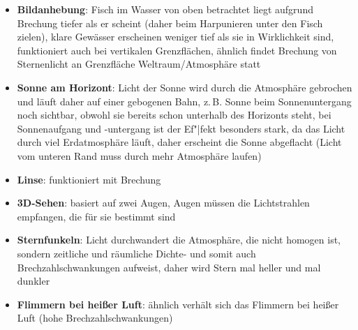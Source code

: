 \linie
\begin{itemize}
    \item
    \textbf{Bildanhebung}:
    Fisch im Wasser von oben betrachtet liegt aufgrund Brechung
    tiefer als er scheint (daher beim Harpunieren unter den Fisch zielen),
    klare Gewässer erscheinen weniger tief als sie in Wirklichkeit sind,
    funktioniert auch bei vertikalen Grenzflächen,
    ähnlich findet Brechung von Sternenlicht an Grenzfläche
    Weltraum/Atmosphäre statt

    \item
    \textbf{Sonne am Horizont}:
    Licht der Sonne wird durch die Atmosphäre gebrochen und läuft daher
    auf einer gebogenen Bahn, z.\,B. Sonne beim Sonnenuntergang
    noch sichtbar, obwohl sie bereits schon unterhalb des Horizonts steht,
    bei Sonnenaufgang und -untergang ist der Ef"|fekt besonders stark,
    da das Licht durch viel Erdatmosphäre läuft,
    daher erscheint die Sonne abgeflacht
    (Licht vom unteren Rand muss durch mehr Atmosphäre laufen)
\end{itemize}
\linie
\begin{itemize}
    \item
    \textbf{Linse}:
    funktioniert mit Brechung

    \item
    \textbf{3D-Sehen}:
    basiert auf zwei Augen,
    Augen müssen die Lichtstrahlen empfangen, die für sie bestimmt sind
\end{itemize}
\linie
\begin{itemize}
    \item
    \textbf{Sternfunkeln}:
    Licht durchwandert die Atmosphäre, die nicht homogen ist,
    sondern zeitliche und räumliche Dichte- und somit auch
    Brechzahlschwankungen aufweist, daher wird Stern mal heller und mal dunkler

    \item
    \textbf{Flimmern bei heißer Luft}:
    ähnlich verhält sich das Flimmern bei heißer Luft
    (hohe Brechzahlschwankungen)
\end{itemize}
\linie
\pagebreak

